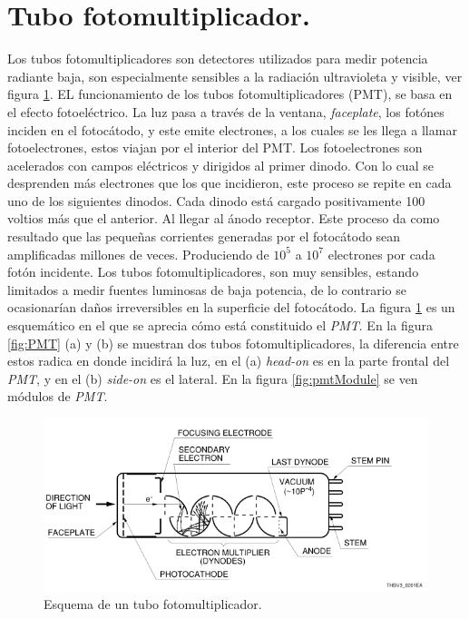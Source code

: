 \section{Tubo fotomultiplicador.}
Los tubos fotomultiplicadores son detectores utilizados para medir potencia radiante baja, son especialmente sensibles a la radiación ultravioleta y visible, ver figura \ref{fig:pmte}. EL funcionamiento de los tubos fotomultiplicadores (PMT), se basa en el efecto fotoeléctrico.  
La luz pasa a través de la ventana, \textit{faceplate}, los fotónes inciden en el fotocátodo, y este emite electrones, a los cuales se les llega a llamar fotoelectrones, estos viajan por el interior del PMT.  Los fotoelectrones son acelerados con campos eléctricos y dirigidos al primer dinodo. Con lo cual se desprenden más electrones que los que incidieron, este proceso se repite en cada uno de los siguientes dinodos. Cada dinodo está cargado positivamente 100 voltios más que el anterior. Al llegar al ánodo receptor. Este proceso da como resultado que las pequeñas corrientes generadas por el fotocátodo sean amplificadas millones de veces. Produciendo de $10^5$ a $10^7$ electrones por cada fotón incidente.
Los tubos fotomultiplicadores, son muy sensibles, estando limitados a medir fuentes luminosas de baja potencia, de lo contrario se ocasionarían daños irreversibles en la superficie del fotocátodo.
La figura \ref{fig:pmte} es un esquemático en el que se aprecia cómo está constituido el \textit{PMT}. En la figura \ref{fig:PMT} (a) y (b) se muestran dos tubos fotomultiplicadores, la diferencia entre estos radica en donde incidirá la luz, en el (a) \textit{head-on} es en la parte frontal del \textit{PMT}, y en el (b) \textit{side-on} es el lateral. En la figura \ref{fig:pmtModule} se ven módulos de \textit{PMT}. 
 
 \begin{figure}
	\centering
	\includegraphics[width=0.9\linewidth]{Imagenes/2/PMT}
	\caption[Esquema de un tubo fotomultiplicador.]{Esquema de un tubo fotomultiplicador.\cite{Hamamatsu2006}}
	\label{fig:pmte}
\end{figure}

